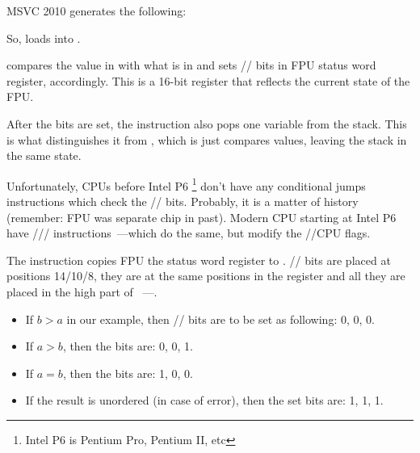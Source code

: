 
MSVC 2010 generates the following:




So, \FLD loads  into .

\label{Czero_etc}
\newcommand{\Czero}{\GTT{C0}\xspace}
\newcommand{\Ctwo}{\GTT{C2}\xspace}
\newcommand{\Cthree}{\GTT{C3}\xspace}
\newcommand{\CThreeBits}{\Cthree/\Ctwo/\Czero}


\FCOMP compares the value in  with what is in  
and sets \CThreeBits bits in FPU status word register, accordingly. 
This is a 16-bit register that reflects the current state of the FPU.

After the bits are set, the \FCOMP instruction also pops one variable from the stack. 
This is what distinguishes it from \FCOM, which is just compares values, leaving the stack in the same state.

Unfortunately, CPUs before Intel P6
\footnote{Intel P6 is Pentium Pro, Pentium II, etc} don't have any conditional 
jumps instructions which check the \CThreeBits bits. 
Probably, it is a matter of history (remember: FPU was separate chip in past).
Modern CPU starting at Intel P6 have \FCOMI/\FCOMIP/\FUCOMI/\FUCOMIP 
instructions~---which do the same, but modify the \ZF/\PF/\CF CPU flags.


The \FNSTSW instruction copies FPU the status word register to \AX. 
\CThreeBits bits are placed at positions 14/10/8, 
they are at the same positions in the \AX register and all they are placed in the high part of \AX{}~---\AH{}.

\begin{itemize}
\item If $b>a$ in our example, then \CThreeBits bits are to be set as following: 0, 0, 0.
\item If $a>b$, then the bits are: 0, 0, 1.
\item If $a=b$, then the bits are: 1, 0, 0.
\item

If the result is unordered (in case of error), then the set bits are: 1, 1, 1.
\end{itemize}

